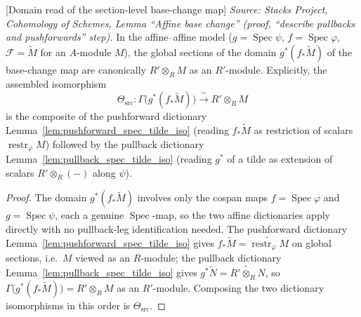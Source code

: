 \begin{lemma}



[Domain read of the section-level base-change map]
  \label{lem:base_change_mate_domain_read}
  \textit{Source: Stacks Project, Cohomology of Schemes, Lemma ``Affine base
  change'' (proof, ``describe pullbacks and pushforwards'' step).}
  In the affine--affine model (\(g = \operatorname{Spec}\psi\),
  \(f = \operatorname{Spec}\varphi\), \(\mathcal{F} = \widetilde M\) for an
  \(A\)-module \(M\)), the global sections of the domain \(g^*(f_*\widetilde M)\) of the
  base-change map are canonically \(R' \otimes_R M\) as an \(R'\)-module. Explicitly,
  the assembled isomorphism
  \[
    \Theta_{\mathrm{src}} :
    \Gamma\bigl(g^*(f_*\widetilde M)\bigr) \xrightarrow{\ \sim\ } R' \otimes_R M
  \]
  is the composite of the pushforward dictionary
  Lemma~\ref{lem:pushforward_spec_tilde_iso} (reading \(f_*\widetilde M\) as
  restriction of scalars \(\operatorname{restr}_\varphi M\)) followed by the pullback
  dictionary Lemma~\ref{lem:pullback_spec_tilde_iso} (reading \(g^*\) of a tilde as
  extension of scalars \(R' \otimes_R (-)\) along \(\psi\)).
\end{lemma}

\begin{proof}
  The domain \(g^*(f_*\widetilde M)\) involves only the cospan maps
  \(f = \operatorname{Spec}\varphi\) and \(g = \operatorname{Spec}\psi\), each a genuine
  \(\operatorname{Spec}\)-map, so the two affine dictionaries apply directly with no
  pullback-leg identification needed. The pushforward dictionary
  Lemma~\ref{lem:pushforward_spec_tilde_iso} gives
  \(f_*\widetilde M = \widetilde{\operatorname{restr}_\varphi M}\) on global sections,
  i.e.\ \(M\) viewed as an \(R\)-module; the pullback dictionary
  Lemma~\ref{lem:pullback_spec_tilde_iso} gives
  \(g^*\widetilde N = \widetilde{R' \otimes_R N}\), so
  \(\Gamma\bigl(g^*(f_*\widetilde M)\bigr) = R' \otimes_R M\) as an \(R'\)-module.
  Composing the two dictionary isomorphisms in this order is \(\Theta_{\mathrm{src}}\).
\end{proof}

